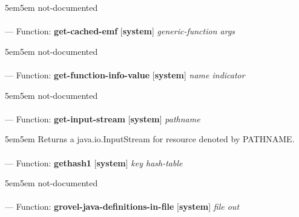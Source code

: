 \begin{adjustwidth}{5em}{5em}
not-documented
\end{adjustwidth}

\paragraph{}
\label{SYSTEM:GET-CACHED-EMF}
--- Function: \textbf{get-cached-emf} [\textbf{system}] \textit{generic-function args}

\begin{adjustwidth}{5em}{5em}
not-documented
\end{adjustwidth}

\paragraph{}
\label{SYSTEM:GET-FUNCTION-INFO-VALUE}
--- Function: \textbf{get-function-info-value} [\textbf{system}] \textit{name indicator}

\begin{adjustwidth}{5em}{5em}
not-documented
\end{adjustwidth}

\paragraph{}
\label{SYSTEM:GET-INPUT-STREAM}
--- Function: \textbf{get-input-stream} [\textbf{system}] \textit{pathname}

\begin{adjustwidth}{5em}{5em}
Returns a java.io.InputStream for resource denoted by PATHNAME.
\end{adjustwidth}

\paragraph{}
\label{SYSTEM:GETHASH1}
--- Function: \textbf{gethash1} [\textbf{system}] \textit{key hash-table}

\begin{adjustwidth}{5em}{5em}
not-documented
\end{adjustwidth}

\paragraph{}
\label{SYSTEM:GROVEL-JAVA-DEFINITIONS-IN-FILE}
--- Function: \textbf{grovel-java-definitions-in-file} [\textbf{system}] \textit{file out}

